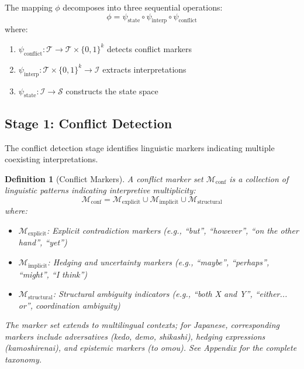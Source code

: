 \documentclass[11pt,a4paper]{article}
\newtheorem{definition}{Definition}
\begin{document}
The mapping $\phi$ decomposes into three sequential operations:
\begin{equation}
\phi = \psi_{\text{state}} \circ \psi_{\text{interp}} \circ \psi_{\text{conflict}}
\end{equation}
where:
\begin{enumerate}
    \item $\psi_{\text{conflict}}: \mathcal{T} \to \mathcal{T} \times \{0,1\}^k$ 
          detects conflict markers
    \item $\psi_{\text{interp}}: \mathcal{T} \times \{0,1\}^k \to \mathcal{I}$ 
          extracts interpretations
    \item $\psi_{\text{state}}: \mathcal{I} \to \mathcal{S}$ 
          constructs the state space
\end{enumerate}

\subsection{Stage 1: Conflict Detection}

The conflict detection stage identifies linguistic markers indicating 
multiple coexisting interpretations.

\begin{definition}[Conflict Markers]
A \textit{conflict marker set} $\mathcal{M}_{\text{conf}}$ is a collection of 
linguistic patterns indicating interpretive multiplicity:
\begin{equation}
\mathcal{M}_{\text{conf}} = \mathcal{M}_{\text{explicit}} \cup \mathcal{M}_{\text{implicit}} \cup \mathcal{M}_{\text{structural}}
\end{equation}
where:
\begin{itemize}
    \item $\mathcal{M}_{\text{explicit}}$: Explicit contradiction markers 
          (e.g., ``but'', ``however'', ``on the other hand'', ``yet'')
    \item $\mathcal{M}_{\text{implicit}}$: Hedging and uncertainty markers 
          (e.g., ``maybe'', ``perhaps'', ``might'', ``I think'')
    \item $\mathcal{M}_{\text{structural}}$: Structural ambiguity indicators 
          (e.g., ``both X and Y'', ``either... or'', coordination ambiguity)
\end{itemize}
The marker set extends to multilingual contexts; for Japanese, corresponding 
markers include adversatives (\textit{kedo}, \textit{demo}, 
\textit{shikashi}), hedging expressions (\textit{kamoshirenai}), 
and epistemic markers (\textit{to omou}). See Appendix for the complete taxonomy.
\end{definition}
\end{document}
